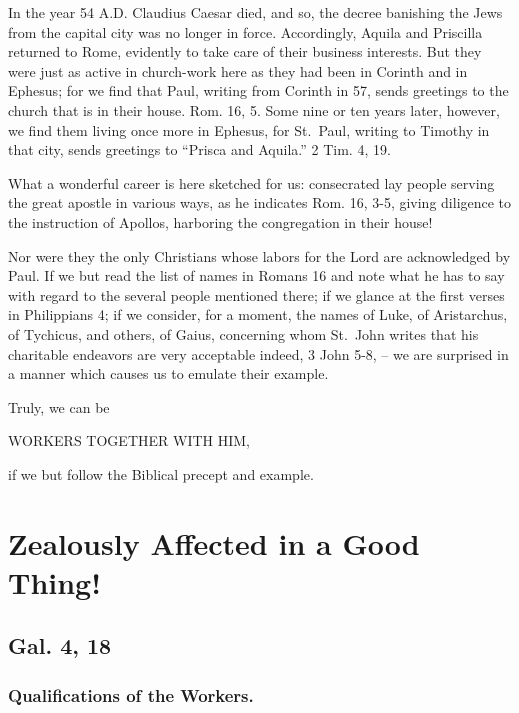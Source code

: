 \documentclass[
]{book}
\begin{document}
In the year 54 A.D. Claudius Caesar died, and so, the decree banishing the Jews from the capital city was no longer in force. Accordingly, Aquila and Priscilla returned to Rome, evidently to take care of their business interests. But they were just as active in church-work here as they had been in Corinth and in Ephesus; for we find that Paul, writing from Corinth in 57, sends greetings to the church that is in their house. Rom. 16, 5. Some nine or ten years later, however, we find them living once more in Ephesus, for St.~Paul, writing to Timothy in that city, sends greetings to ``Prisca and Aquila.'' 2 Tim. 4, 19.

What a wonderful career is here sketched for us: consecrated lay people serving the great apostle in various ways, as he indicates Rom. 16, 3-5, giving diligence to the instruction of Apollos, harboring the congregation in their house!

Nor were they the only Christians whose labors for the Lord are acknowledged by Paul. If we but read the list of names in Romans 16 and note what he has to say with regard to the several people mentioned there; if we glance at the first verses in Philippians 4; if we consider, for a moment, the names of Luke, of Aristarchus, of Tychicus, and others, of Gaius, concerning whom St.~John writes that his charitable endeavors are very acceptable indeed, 3 John 5-8, -- we are surprised in a manner which causes us to emulate their example.

Truly, we can be

\begin{center} WORKERS TOGETHER WITH HIM, \end{center}

if we but follow the Biblical precept and example.

\hypertarget{zealously-affected-in-a-good-thing}{%
\chapter{Zealously Affected in a Good Thing!}\label{zealously-affected-in-a-good-thing}}

\hypertarget{gal.-4-18}{%
\section*{Gal. 4, 18}\label{gal.-4-18}}

\hypertarget{qualifications-of-the-workers.}{%
\subsection*{Qualifications of the Workers.}\label{qualifications-of-the-workers.}}
\end{document}
